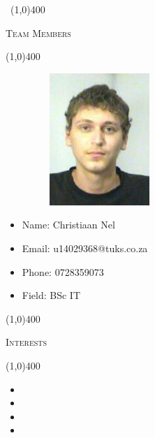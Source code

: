 \documentclass[12pt,a4paper]{report}
\begin{document}
	\newpage
	\begin{center}
	\vspace*{-3cm}\
	\line(1,0){400}\\
	{\scshape\Large Team Members\par}
	\line(1,0){400}\\
	\end{center}
	

\begin{minipage}{0.5\textwidth}
\begin{figure}[H]
\includegraphics[width=5cm,height=5cm,keepaspectratio]{u14029368.jpeg}
\end{figure}
\end{minipage} \hfill
\begin{minipage}{0.6\textwidth}
\begin{itemize}
\item[] Name: Christiaan Nel
\item[] Email: u14029368@tuks.co.za
\item[] Phone: 0728359073
\item[] Field: BSc IT
\end{itemize}
\end{minipage}

\begin{center}
	
	\line(1,0){400}\\
	{\scshape\large Interests\par}
	\line(1,0){400}\\
	\end{center}
	\begin{itemize}
\item 
\item 
\item 
\item 
\end{itemize}
	
\end{document}
